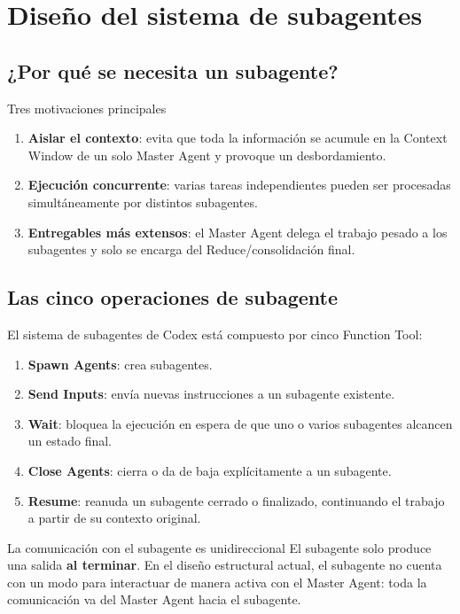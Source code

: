 \section{Diseño del sistema de subagentes}

\subsection{¿Por qué se necesita un subagente?}

\begin{importantbox}{Tres motivaciones principales}
\begin{enumerate}
    \item \textbf{Aislar el contexto}: evita que toda la información se acumule en la Context Window de un solo Master Agent y provoque un desbordamiento.
    \item \textbf{Ejecución concurrente}: varias tareas independientes pueden ser procesadas simultáneamente por distintos subagentes.
    \item \textbf{Entregables más extensos}: el Master Agent delega el trabajo pesado a los subagentes y solo se encarga del Reduce/consolidación final.
\end{enumerate}
\end{importantbox}

\subsection{Las cinco operaciones de subagente}

El sistema de subagentes de Codex está compuesto por cinco Function Tool:

\begin{enumerate}
    \item \textbf{Spawn Agents}: crea subagentes.
    \item \textbf{Send Inputs}: envía nuevas instrucciones a un subagente existente.
    \item \textbf{Wait}: bloquea la ejecución en espera de que uno o varios subagentes alcancen un estado final.
    \item \textbf{Close Agents}: cierra o da de baja explícitamente a un subagente.
    \item \textbf{Resume}: reanuda un subagente cerrado o finalizado, continuando el trabajo a partir de su contexto original.
\end{enumerate}

\begin{warningbox}{La comunicación con el subagente es unidireccional}
El subagente solo produce una salida \textbf{al terminar}. En el diseño estructural actual, el subagente no cuenta con un modo para interactuar de manera activa con el Master Agent: toda la comunicación va del Master Agent hacia el subagente.
\end{warningbox}

